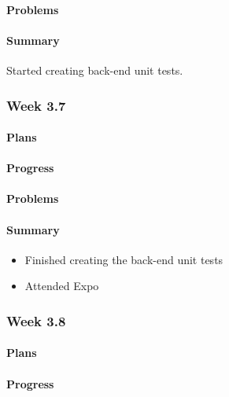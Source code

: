 \documentclass[onecolumn, draftclsnofoot,10pt, compsoc]{article}
\begin{document}
		    \paragraph{Problems} \hfill \break
		    
		    \paragraph{Summary} \hfill \break
		        Started creating back-end unit tests.
		    
		\subsubsection{Week 3.7}
		    \paragraph{Plans} \hfill \break

		    \paragraph{Progress} \hfill \break
		    
		    \paragraph{Problems} \hfill \break
		       
		    \paragraph{Summary} \hfill \break
		    	\begin{itemize}
                    \item Finished creating the back-end unit tests
                    \item Attended Expo
                \end{itemize}
		   
		\subsubsection{Week 3.8}
		    \paragraph{Plans} \hfill \break
		    \paragraph{Progress} \hfill \break
\end{document}

